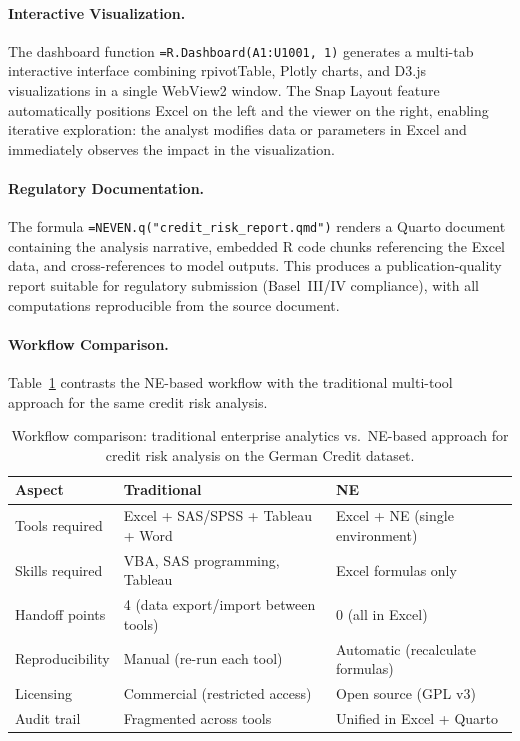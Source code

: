 \documentclass[preprint,12pt,authoryear]{elsarticle}
\newcommand{\neven}{NE\raisebox{0.2ex}{v}\rotatebox[origin=c]{180}{E}\rotatebox[origin=c]{180}{N}}
\begin{document}
\paragraph{Interactive Visualization.}
The dashboard function \texttt{=R.Dashboard(A1:U1001, 1)} generates a multi-tab interactive interface combining rpivotTable, Plotly charts, and D3.js visualizations in a single WebView2 window. The Snap Layout feature automatically positions Excel on the left and the viewer on the right, enabling iterative exploration: the analyst modifies data or parameters in Excel and immediately observes the impact in the visualization.

\paragraph{Regulatory Documentation.}
The formula \texttt{=NEVEN.q("credit\_risk\_report.qmd")} renders a Quarto document containing the analysis narrative, embedded R code chunks referencing the Excel data, and cross-references to model outputs. This produces a publication-quality report suitable for regulatory submission (Basel~III/IV compliance), with all computations reproducible from the source document.

\paragraph{Workflow Comparison.}
Table~\ref{tab:enterprise_comparison} contrasts the \neven{}-based workflow with the traditional multi-tool approach for the same credit risk analysis.

\begin{table}[htbp]
\centering
\caption{Workflow comparison: traditional enterprise analytics vs.\ \neven{}-based approach for credit risk analysis on the German Credit dataset.}
\label{tab:enterprise_comparison}
\begin{tabular}{@{}lp{4.5cm}p{4.5cm}@{}}
\toprule
\textbf{Aspect} & \textbf{Traditional} & \textbf{\neven{}} \\
\midrule
Tools required & Excel + SAS/SPSS + Tableau + Word & Excel + \neven{} (single environment) \\
\addlinespace
Skills required & VBA, SAS programming, Tableau & Excel formulas only \\
\addlinespace
Handoff points & 4 (data export/import between tools) & 0 (all in Excel) \\
\addlinespace
Reproducibility & Manual (re-run each tool) & Automatic (recalculate formulas) \\
\addlinespace
Licensing & Commercial (restricted access) & Open source (GPL v3) \\
\addlinespace
Audit trail & Fragmented across tools & Unified in Excel + Quarto \\
\bottomrule
\end{tabular}
\end{table}
\end{document}
